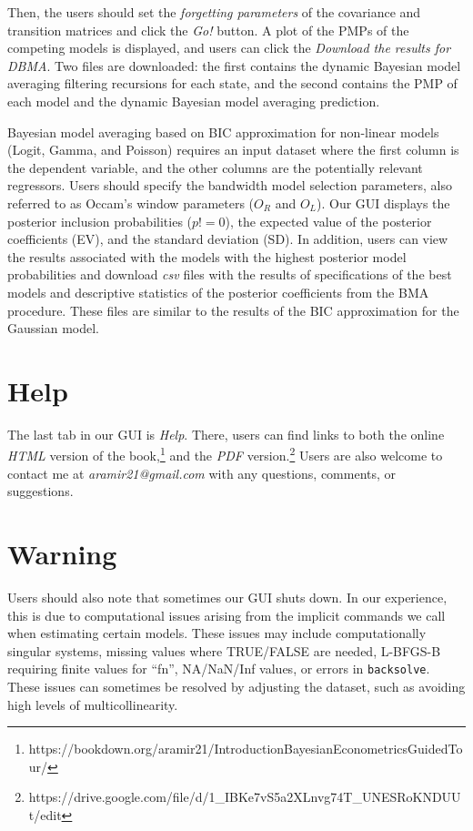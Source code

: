 Then, the users should set the \textit{forgetting parameters} of the covariance and transition matrices and click the \textit{Go!} button. A plot of the PMPs of the competing models is displayed, and users can click the \textit{Download the results for DBMA}. Two files are downloaded: the first contains the dynamic Bayesian model averaging filtering recursions for each state, and the second contains the PMP of each model and the dynamic Bayesian model averaging prediction.

Bayesian model averaging based on BIC approximation for non-linear models (Logit, Gamma, and Poisson) requires an input dataset where the first column is the dependent variable, and the other columns are the potentially relevant regressors. Users should specify the bandwidth model selection parameters, also referred to as Occam's window parameters ($O_R$ and $O_L$). Our GUI displays the posterior inclusion probabilities ($p!=0$), the expected value of the posterior coefficients (EV), and the standard deviation (SD). In addition, users can view the results associated with the models with the highest posterior model probabilities and download \textit{csv} files with the results of specifications of the best models and descriptive statistics of the posterior coefficients from the BMA procedure. These files are similar to the results of the BIC approximation for the Gaussian model.

\section{Help}\label{secGUI7}

The last tab in our GUI is \textit{Help}. There, users can find links to both the online \textit{HTML} version of the book,\footnote{https://bookdown.org/aramir21/IntroductionBayesianEconometricsGuidedTour/} and the \textit{PDF} version.\footnote{https://drive.google.com/file/d/1\_IBKe7vS5a2XLnvg74T\_UNESRoKNDUUt/edit} Users are also welcome to contact me at \textit{aramir21@gmail.com} with any questions, comments, or suggestions.

\section{Warning}\label{secGUI8}

Users should also note that sometimes our GUI shuts down. In our experience, this is due to computational issues arising from the implicit commands we call when estimating certain models. These issues may include computationally singular systems, missing values where TRUE/FALSE are needed, L-BFGS-B requiring finite values for ``fn'', NA/NaN/Inf values, or errors in \texttt{backsolve}. These issues can sometimes be resolved by adjusting the dataset, such as avoiding high levels of multicollinearity.

